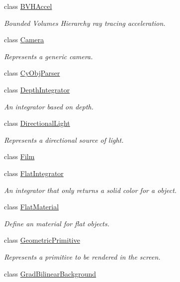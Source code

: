 \begin{DoxyCompactItemize}
class \mbox{\hyperlink{classomg_1_1_b_v_h_accel}{B\+V\+H\+Accel}}
\begin{DoxyCompactList}\small\item\em Bounded Volumes Hierarchy ray tracing acceleration. \end{DoxyCompactList}\item 
class \mbox{\hyperlink{classomg_1_1_camera}{Camera}}
\begin{DoxyCompactList}\small\item\em Represents a generic camera. \end{DoxyCompactList}\item 
class \mbox{\hyperlink{classomg_1_1_cy_obj_parser}{Cy\+Obj\+Parser}}
\item 
class \mbox{\hyperlink{classomg_1_1_depth_integrator}{Depth\+Integrator}}
\begin{DoxyCompactList}\small\item\em An integrator based on depth. \end{DoxyCompactList}\item 
class \mbox{\hyperlink{classomg_1_1_directional_light}{Directional\+Light}}
\begin{DoxyCompactList}\small\item\em Represents a directional source of light. \end{DoxyCompactList}\item 
class \mbox{\hyperlink{classomg_1_1_film}{Film}}
\item 
class \mbox{\hyperlink{classomg_1_1_flat_integrator}{Flat\+Integrator}}
\begin{DoxyCompactList}\small\item\em An integrator that only returns a solid color for a object. \end{DoxyCompactList}\item 
class \mbox{\hyperlink{classomg_1_1_flat_material}{Flat\+Material}}
\begin{DoxyCompactList}\small\item\em Define an material for flat objects. \end{DoxyCompactList}\item 
class \mbox{\hyperlink{classomg_1_1_geometric_primitive}{Geometric\+Primitive}}
\begin{DoxyCompactList}\small\item\em Represents a primitive to be rendered in the screen. \end{DoxyCompactList}\item 
class \mbox{\hyperlink{classomg_1_1_grad_bilinear_background}{Grad\+Bilinear\+Background}}

\end{DoxyCompactItemize}
